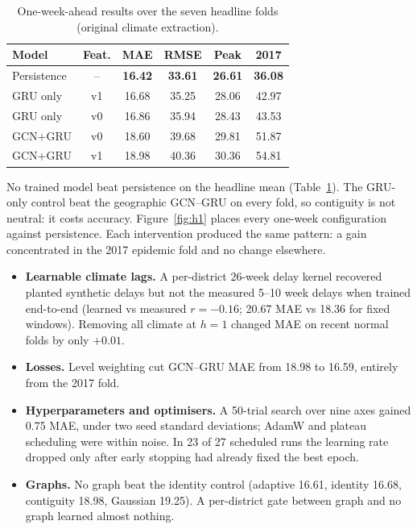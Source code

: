\begin{table}[t]
\centering
\caption{One-week-ahead results over the seven headline folds (original climate extraction).}
\label{tab:h1baseline}
\begin{tabular}{lccccc}
\toprule
\textbf{Model} & \textbf{Feat.} & \textbf{MAE} & \textbf{RMSE} & \textbf{Peak} & \textbf{2017} \\
\midrule
Persistence & -- & \textbf{16.42} & \textbf{33.61} & \textbf{26.61} & \textbf{36.08} \\
GRU only & v1 & 16.68 & 35.25 & 28.06 & 42.97 \\
GRU only & v0 & 16.86 & 35.94 & 28.43 & 43.53 \\
GCN+GRU & v0 & 18.60 & 39.68 & 29.81 & 51.87 \\
GCN+GRU & v1 & 18.98 & 40.36 & 30.36 & 54.81 \\
\bottomrule
\end{tabular}
\end{table}

No trained model beat persistence on the headline mean (Table~\ref{tab:h1baseline}). The GRU-only control beat the geographic GCN--GRU on every fold, so contiguity is not neutral: it costs accuracy. Figure~\ref{fig:h1} places every one-week configuration against persistence. Each intervention produced the same pattern: a gain concentrated in the 2017 epidemic fold and no change elsewhere.
\begin{itemize}
\item \textbf{Learnable climate lags.} A per-district 26-week delay kernel recovered planted synthetic delays but not the measured 5--10 week delays when trained end-to-end (learned vs measured $r=-0.16$; 20.67 MAE vs 18.36 for fixed windows). Removing all climate at $h=1$ changed MAE on recent normal folds by only $+0.01$.
\item \textbf{Losses.} Level weighting cut GCN--GRU MAE from 18.98 to 16.59, entirely from the 2017 fold.
\item \textbf{Hyperparameters and optimisers.} A 50-trial search over nine axes gained 0.75 MAE, under two seed standard deviations; AdamW and plateau scheduling were within noise. In 23 of 27 scheduled runs the learning rate dropped only after early stopping had already fixed the best epoch.
\item \textbf{Graphs.} No graph beat the identity control (adaptive 16.61, identity 16.68, contiguity 18.98, Gaussian 19.25). A per-district gate between graph and no graph learned almost nothing.
\end{itemize}

